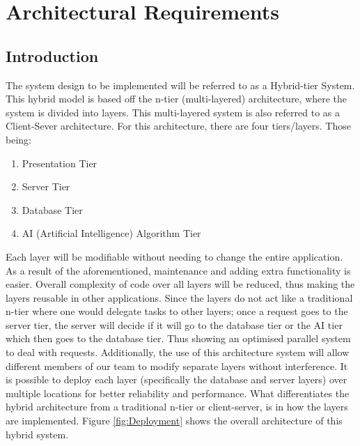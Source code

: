 \documentclass[]{article}
\begin{document}
\thispagestyle{empty}\selectfont	
	\tableofcontents
	\clearpage
	
	\section*{Architectural Requirements}
		\begin{adjustwidth}{2.5em}{0pt}
			\subsection*{Introduction}
			\begin{flushleft}
				The system design to be implemented will be referred to as a Hybrid-tier System. This hybrid model is based off the n-tier (multi-layered) architecture, where the system is divided into layers. This multi-layered system is also referred to as a Client-Sever architecture. For this architecture, there are four tiers/layers. Those being: 
				\begin{enumerate}
					\item Presentation Tier
					\item Server Tier
					\item Database Tier
					\item AI (Artificial Intelligence) Algorithm Tier
				\end{enumerate}
				 Each layer will be modifiable without needing to change the entire application. As a result of the aforementioned, maintenance and adding extra functionality is easier. Overall complexity of code over all layers will be reduced, thus making the layers reusable in other applications. Since the layers do not act like a traditional n-tier where one would delegate tasks to other layers; once a request goes to the server tier, the server will decide if it will go to the database tier or the AI tier which then goes to the database tier. Thus showing an optimised parallel system to deal with requests.
				 Additionally, the use of this architecture system will allow different members of our team to modify separate layers without interference. It is possible to deploy each layer (specifically the database and server layers) over multiple locations for better reliability and performance. What differentiates the hybrid architecture from a traditional n-tier or client-server, is in how the layers are implemented. Figure \ref{fig:Deployment} shows the overall architecture of this hybrid system.

\end{flushleft}
\end{adjustwidth}
\end{document}
